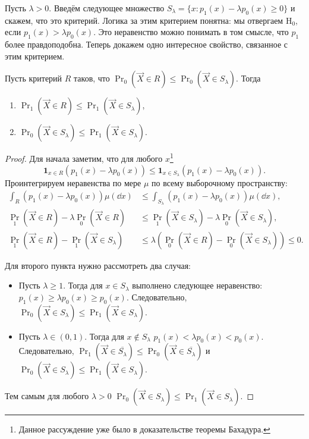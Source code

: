 Пусть $\lambda > 0$. Введём следующее множество $S_{\lambda} = \{x \colon p_{1}(x) - \lambda p_{0}(x) \geq 0\}$ и скажем, что это критерий. Логика за этим критерием понятна: мы отвергаем $\mathrm{H}_{0}$, если $p_{1}(x) > \lambda p_{0}(x)$. Это неравенство можно понимать в том смысле, что $p_{1}$ более правдоподобна. Теперь докажем одно интересное свойство, связанное с этим критерием.

\begin{lemma}
	Пусть критерий $R$ таков, что $\Pr_{0}(\vec{X} \in R) \leq \Pr_{0}(\vec{X} \in S_{\lambda})$. Тогда
	\begin{enumerate}[label=\alph*)]
		\item $\Pr_{1}(\vec{X} \in R) \leq \Pr_{1}(\vec{X} \in S_{\lambda})$,
		\item $\Pr_{0}(\vec{X} \in S_{\lambda}) \leq \Pr_{1}(\vec{X} \in S_{\lambda})$.
	\end{enumerate}
\end{lemma}
\begin{proof}
	Для начала заметим, что для любого $x$\footnote{Данное рассуждение уже было в доказательстве теоремы Бахадура.}
	\begin{equation}
		\mathbf{1}_{x \in R}(p_{1}(x) - \lambda p_{0}(x)) \leq \mathbf{1}_{x \in S_{\lambda}}(p_{1}(x) - \lambda p_{0}(x)).
	\end{equation}
	Проинтегрируем неравенства по мере $\mu$ по всему выборочному пространству:
	\begin{align}
		\int_{R} (p_{1}(x) - \lambda p_{0}(x))\mu(\dd x) &\leq \int_{S_{\lambda}} (p_{1}(x) - \lambda p_{0}(x))\mu(\dd x), \\
		\Pr_{1}(\vec{X} \in R) - \lambda \Pr_{0}(\vec{X} \in R) &\leq \Pr_{1}(\vec{X} \in S_{\lambda}) - \lambda \Pr_{0}(\vec{X} \in S_{\lambda}), \\
		\Pr_{1}(\vec{X} \in R) - \Pr_{1}(\vec{X} \in S_{\lambda}) &\leq \lambda(\Pr_{0}(\vec{X} \in R) - \Pr_{0}(\vec{X} \in S_{\lambda})) \leq 0.
	\end{align}

	Для второго пункта нужно рассмотреть два случая:
	\begin{itemize}
		\item Пусть $\lambda \geq 1$. Тогда для $x \in S_{\lambda}$ выполнено следующее неравенство: $p_{1}(x) \geq \lambda p_{0}(x) \geq p_{0}(x)$. Следовательно, $\Pr_{0}(\vec{X} \in S_{\lambda}) \leq \Pr_{1}(\vec{X} \in S_{\lambda})$.
		\item Пусть $\lambda \in (0, 1)$. Тогда для $x \not\in S_{\lambda}$ $p_{1}(x) < \lambda p_{0}(x) < p_{0}(x)$. Следовательно, $\Pr_{1}(\vec{X} \in \overline{S_{\lambda}}) \leq \Pr_{0}(\vec{X} \in \overline{S_{\lambda}})$ и $\Pr_{0}(\vec{X} \in S_{\lambda}) \leq \Pr_{1}(\vec{X} \in S_{\lambda})$.
	\end{itemize}
	Тем самым для любого $\lambda > 0$ $\Pr_{0}(\vec{X} \in S_{\lambda}) \leq \Pr_{1}(\vec{X} \in S_{\lambda})$.
\end{proof}
